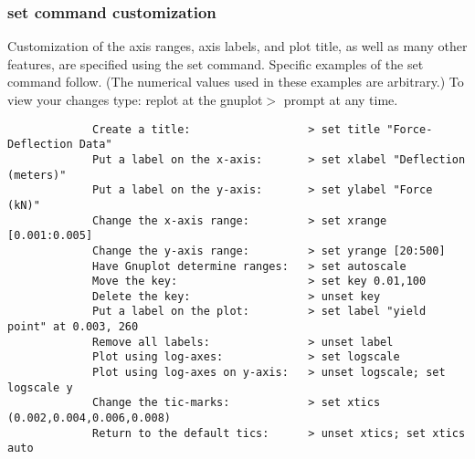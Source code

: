 	  \subsubsection{ set command customization}
	   Customization of the axis ranges, axis labels, and plot title, as well as many other features, are specified using the set command. Specific examples of the set command follow. (The numerical values used in these examples are arbitrary.) To view your changes type: replot at the gnuplot$>$ prompt at any time. 
	   \begin{verbatim}
	         Create a title:                  > set title "Force-Deflection Data" 
	         Put a label on the x-axis:       > set xlabel "Deflection (meters)"
	         Put a label on the y-axis:       > set ylabel "Force (kN)"
	         Change the x-axis range:         > set xrange [0.001:0.005]
	         Change the y-axis range:         > set yrange [20:500]
	         Have Gnuplot determine ranges:   > set autoscale
	         Move the key:                    > set key 0.01,100
	         Delete the key:                  > unset key
	         Put a label on the plot:         > set label "yield point" at 0.003, 260 
	         Remove all labels:               > unset label
	         Plot using log-axes:             > set logscale
	         Plot using log-axes on y-axis:   > unset logscale; set logscale y 
	         Change the tic-marks:            > set xtics (0.002,0.004,0.006,0.008)
	         Return to the default tics:      > unset xtics; set xtics auto
	         
	         
	   \end{verbatim}


